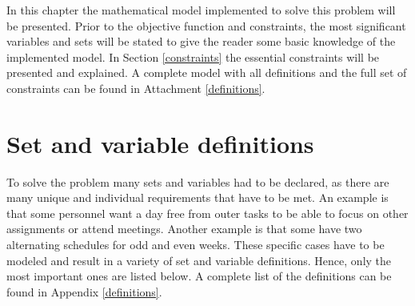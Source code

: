 In this chapter the mathematical model implemented to solve this problem will be presented. Prior to the objective function and constraints, the most significant variables and sets will be stated to give the reader some basic knowledge of the implemented model. In Section \ref{constraints} the essential constraints will be presented and explained. A complete model with all definitions and the full set of constraints can be found in Attachment \ref{definitions}. %
\section{Set and variable definitions} \label{variables}
To solve the problem many sets and variables had to be declared, as there are many unique and individual requirements that have to be met. An example is that some personnel want a day free from outer tasks to be able to focus on other assignments or attend meetings. Another example is that some have two alternating schedules for odd and even weeks. These specific cases have to be modeled and result in a variety of set and variable definitions. Hence, only the most important ones are listed below. A complete list of the definitions can be found in Appendix \ref{definitions}. \\
 \\
  \\
	 	\\
                                                                \\
                                                       \\
                                                   \\
                                                \\

